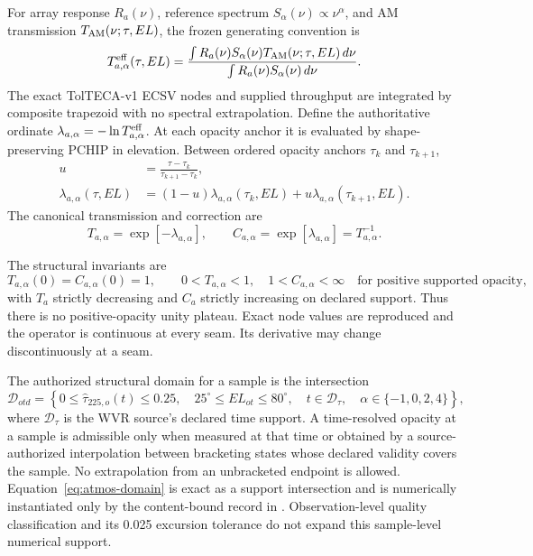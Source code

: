 For array response \(R_a(\nu)\), reference spectrum
\(S_\alpha(\nu)\propto\nu^\alpha\), and AM transmission
\(T_{\rm AM}(\nu;\tau,EL)\), the frozen generating convention is
\begin{equation}
 T^{\rm eff}_{a,\alpha}(\tau,EL)=
 \frac{\int R_a(\nu)S_\alpha(\nu)T_{\rm AM}(\nu;\tau,EL)\,d\nu}
      {\int R_a(\nu)S_\alpha(\nu)\,d\nu}.
  \label{eq:operator-nodes}
\end{equation}
The exact TolTECA-v1 ECSV nodes and supplied throughput are integrated by
composite trapezoid with no spectral extrapolation. Define the authoritative
ordinate \(\lambda_{a,\alpha}=-\ln T^{\rm eff}_{a,\alpha}\). At each opacity
anchor it is evaluated by shape-preserving PCHIP in elevation. Between
ordered opacity anchors \(\tau_k\) and \(\tau_{k+1}\),
\begin{align}
 u&=\frac{\tau-\tau_k}{\tau_{k+1}-\tau_k},
 \label{eq:operator-fraction}\\
 \lambda_{a,\alpha}(\tau,EL)&=(1-u)\lambda_{a,\alpha}(\tau_k,EL)
 +u\lambda_{a,\alpha}(\tau_{k+1},EL).
 \label{eq:piecewise-operator}
\end{align}
The canonical transmission and correction are
\begin{equation}
 T_{a,\alpha}=\exp[-\lambda_{a,\alpha}],\qquad
 C_{a,\alpha}=\exp[\lambda_{a,\alpha}]=T_{a,\alpha}^{-1}.
 \label{eq:operator-orientation}
\end{equation}

The structural invariants are
\begin{equation}
 T_{a,\alpha}(0)=C_{a,\alpha}(0)=1,\qquad
 0<T_{a,\alpha}<1,\quad 1<C_{a,\alpha}<\infty
 \quad\text{for positive supported opacity},
 \label{eq:atmos-invariants}
\end{equation}
with \(T_a\) strictly decreasing and \(C_a\) strictly increasing on declared
support. Thus there is no positive-opacity unity plateau. Exact node values
are reproduced and the operator is continuous at every seam. Its derivative
may change discontinuously at a seam.

The authorized structural domain for a sample is the intersection
\begin{equation}
 \mathcal D_{otd}=\left\{
 0\leq\hat\tau_{225,o}(t)\leq0.25,\quad
 25^\circ\leq EL_{ot}\leq80^\circ,\quad
 t\in\mathcal D_\tau,\quad
 \alpha\in\{-1,0,2,4\}
 \right\},
 \label{eq:atmos-domain}
\end{equation}
where \(\mathcal D_\tau\) is the WVR source's declared time support. A
time-resolved opacity at a sample is admissible only when measured at that
time or obtained by a source-authorized interpolation between bracketing
states whose declared validity covers the sample. No extrapolation from an
unbracketed endpoint is allowed. Equation~\eqref{eq:atmos-domain} is exact as a
support intersection and is numerically instantiated only by the content-bound
record in . Observation-level quality classification and its 0.025
excursion tolerance do not expand this sample-level numerical support.

